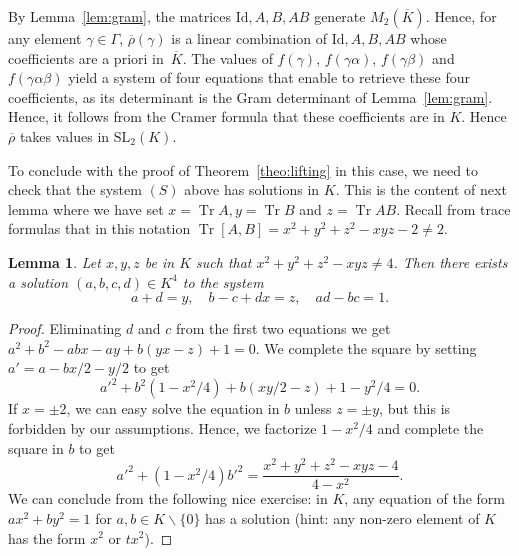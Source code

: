 \documentclass[JEP,XML,SOM,Unicode,NoEqCountersInSection]{cedram}
\newtheorem{lemma}[theorem]{Lemma}
\theoremstyle{definition}
\newcommand{\tr}{\operatorname{Tr}}
\newcommand{\SL}{\mathrm{SL}}
\newcommand{\id}{\mathrm{Id}}
\begin{document}
By Lemma~\ref{lem:gram}, the matrices $\id,A,B,AB$ generate
$M_2(\overline{K})$. Hence, for any element $\gamma\in\Gamma$,
$\overline{\rho}(\gamma)$ is a linear combination of $\id,A,B,AB$ whose
coefficients are a priori in~$\overline{K}$. The values of $f(\gamma)$,
$f(\gamma \alpha)$, $f(\gamma\beta)$ and $f(\gamma\alpha\beta)$ yield a system of four equations that enable to retrieve these four coefficients,
as its determinant is the Gram determinant of Lemma~\ref{lem:gram}.
Hence, it follows from the Cramer formula that these coefficients are in
$K$. Hence $\overline{\rho}$ takes values in $\SL_2(K)$.

To conclude with the proof of Theorem~\ref{theo:lifting} in this case, we
need to check that the system $(S)$ above has solutions in $K$. This is
the content of next lemma where we have set $x=\tr A, y=\tr B$ and
$z=\tr AB$. Recall from trace formulas that in this notation
$\tr [A,B]=x^2+y^2+z^2-xyz-2\ne 2$.

\begin{lemma}\label{ilyaunesolution}
Let $x,y,z$ be in $K$ such that $x^2+y^2+z^2-xyz\ne 4$. Then there exists
a solution $(a,b,c,d)\in K^4$ to the system
\[ a+d=y,\quad b-c+dx=z,\quad ad-bc=1. \]
\end{lemma}
\begin{proof}
Eliminating $d$ and $c$ from the first two equations we get
$a^2+b^2-abx-ay+b(yx-z)+1=0$. We complete the square by setting
$a'=a-bx/2-y/2$ to get
\[ a'^2+b^2(1-x^2/4)+b(xy/2-z)+1-y^2/4=0. \]
If $x=\pm 2$, we can easy solve the equation in $b$ unless $z=\pm y$,
but this is forbidden by our assumptions. Hence, we factorize $1-x^2/4$
and complete the square in $b$ to get
\[
a'^2+(1-x^2/4)b'^2=\frac{x^2+y^2+z^2-xyz-4}{4-x^2}.
\]
We can conclude from the following nice exercise: in $K$, any equation of
the form $ax^2+by^2=1$ for $a,b\in K\smallsetminus\{0\}$ has a solution
(hint: any non-zero element of $K$ has the form $x^2$ or $tx^2$).
\end{proof}
\end{document}
